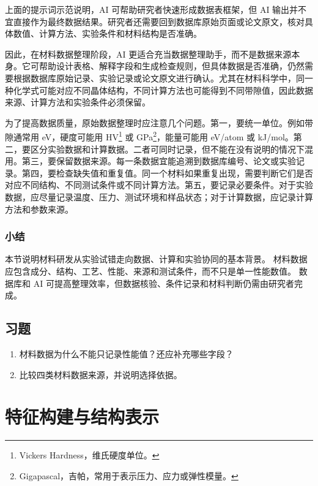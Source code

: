 上面的提示词示范说明，AI 可帮助研究者快速形成数据表框架，但 AI 输出并不宜直接作为最终数据结果。研究者还需要回到数据库原始页面或论文原文，核对具体数值、计算方法、实验条件和材料结构是否准确。

因此，在材料数据整理阶段，AI 更适合充当数据整理助手，而不是数据来源本身。它可帮助设计表格、解释字段和生成检查规则，但具体数据是否准确，仍然需要根据数据库原始记录、实验记录或论文原文进行确认。尤其在材料科学中，同一种化学式可能对应不同晶体结构，不同计算方法也可能得到不同带隙值，因此数据来源、计算方法和实验条件必须保留。


为了提高数据质量，原始数据整理时应注意几个问题。第一，要统一单位。例如带隙通常用 eV，硬度可能用 HV\footnote{Vickers Hardness，维氏硬度单位。} 或 GPa\footnote{Gigapascal，吉帕，常用于表示压力、应力或弹性模量。}，能量可能用 eV/atom 或 kJ/mol。第二，要区分实验数据和计算数据。二者可同时记录，但不能在没有说明的情况下混用。第三，要保留数据来源。每一条数据宜能追溯到数据库编号、论文或实验记录。第四，要检查缺失值和重复值。同一个材料如果重复出现，需要判断它们是否对应不同结构、不同测试条件或不同计算方法。第五，要记录必要条件。对于实验数据，应尽量记录温度、压力、测试环境和样品状态；对于计算数据，应记录计算方法和参数来源。

\subsubsection*{\textbf{小结}}

本节说明材料研发从实验试错走向数据、计算和实验协同的基本背景。
材料数据应包含成分、结构、工艺、性能、来源和测试条件，而不只是单一性能数值。
数据库和 AI 可提高整理效率，但数据核验、条件记录和材料判断仍需由研究者完成。

\subsection*{习题}

\begin{enumerate}[leftmargin=*]
\item 材料数据为什么不能只记录性能值？还应补充哪些字段？
\item 比较四类材料数据来源，并说明选择依据。
\end{enumerate}

\clearpage
\section{特征构建与结构表示}


